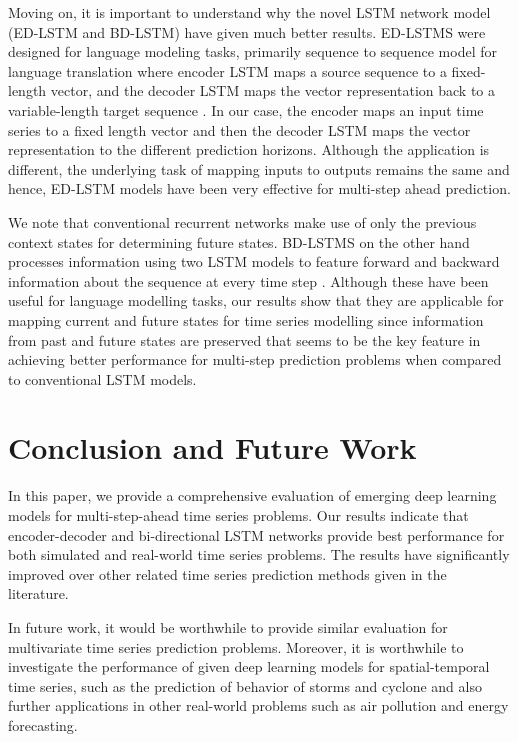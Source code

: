 \documentclass[final,5p,times,twocolumn]{elsarticle}
\begin{document}
  Moving on, it is important to understand why the novel LSTM network model (ED-LSTM and BD-LSTM)  have given much better results. ED-LSTMS were designed for language modeling tasks, primarily sequence to sequence model for language translation where  encoder LSTM maps a source sequence to a fixed-length vector, and the decoder LSTM maps the vector representation back to a variable-length target sequence \cite{sutskever2014sequence}. In our case, the encoder maps an input time series to a fixed length vector and then the decoder LSTM maps the vector representation to the different prediction horizons. Although the application is different, the underlying task of mapping inputs to outputs remains the same and hence, ED-LSTM models have been very effective for multi-step ahead prediction. 
  
  We note that conventional recurrent  networks make use of only the previous context states for determining future states. BD-LSTMS on the other hand   processes information using two  LSTM models to feature forward and backward information about the sequence at every time step \cite{graves2005}. Although these have been useful for language modelling tasks, our results show that they are   applicable for mapping current and  future states for time series modelling since  information from past and future states are preserved that seems to be the key feature in achieving better performance for multi-step prediction problems when compared to conventional LSTM models. 
 
  
 
 \section{Conclusion and Future Work}
 
 In this paper, we  provide a comprehensive evaluation of emerging deep learning models for multi-step-ahead time series problems. Our results indicate that encoder-decoder and bi-directional LSTM networks provide   best performance for both simulated and real-world time series problems. The results have significantly improved over other related time series prediction methods given in the literature. 
 
 In future work, it would be worthwhile to provide similar evaluation for multivariate time series prediction problems. Moreover, it is worthwhile to investigate the performance of given deep learning models for spatial-temporal time series, such as the prediction of behavior of storms and cyclone and also further applications in other real-world problems such as air pollution and energy forecasting.  
\end{document}
